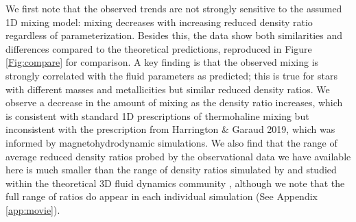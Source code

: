 We first note that the observed trends are not strongly sensitive to the assumed 1D mixing model: mixing decreases with increasing reduced density ratio regardless of parameterization.
%
Besides this, the data show both similarities and differences compared to the theoretical predictions, reproduced in Figure \ref{Fig:compare} for comparison. A key finding is that the observed mixing is strongly correlated with the fluid parameters as predicted; this is true for stars with different masses and metallicities but similar reduced density ratios. %
We observe a decrease in the amount of mixing as the density ratio increases, which is consistent with standard 1D prescriptions of thermohaline mixing but inconsistent with the prescription from Harrington \& Garaud 2019, which was informed by magnetohydrodynamic simulations. %
We also find that the range of average reduced density ratios probed by the observational data we have available here is much smaller than the range of density ratios simulated by and studied within the theoretical 3D fluid dynamics community \citep[e.g.][]{brown_etal_2013}, although we note that the full range of ratios do appear in each individual simulation (See Appendix \ref{app:movie}).%



